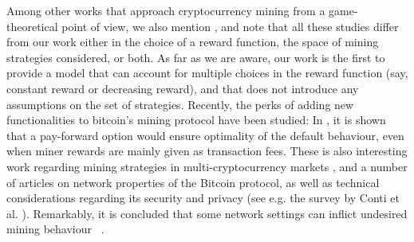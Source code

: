 Among other works that approach cryptocurrency mining from a game-theoretical point of view, we also mention \cite{economics_of_mining2013,selfishmining2014,optimalselfishmining2017,instabilitywithoutreward:2016}, and note that all these studies differ from our work either in the choice of 
a reward function, the space of mining strategies considered, or both. As far as we are aware, our work is the first to provide a model that can account for multiple choices in the reward function (say, constant reward or decreasing reward), and that does not introduce any assumptions on the set of strategies.  Recently, the perks of adding new functionalities to bitcoin's mining protocol have been studied: In \cite{koutsoupias2018blockchain}, it is shown that a pay-forward option would ensure optimality of the default behaviour, even when miner rewards are mainly given as transaction fees.
These is also interesting work regarding mining strategies in multi-cryptocurrency markets \cite{dhamal2018stochastic,spiegelman2018game}, and a number of articles on network properties of the Bitcoin protocol, as well as technical considerations regarding its security and privacy (see e.g. the survey by Conti et al. \cite{conti2018survey}). Remarkably, it is concluded that some network settings can inflict undesired mining behaviour ~\cite{bitcoin_attacks_2013,ddos_attacks2014,empirical_dos_attacks2014}.   


